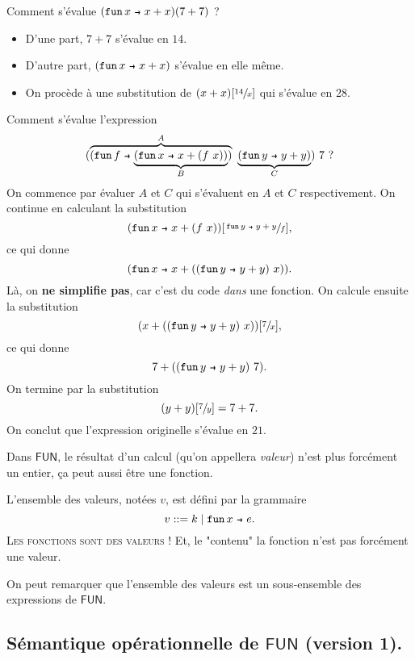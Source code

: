 \documentclass[../main]{subfiles}
\begin{document}
  \begin{exm}
    Comment s'évalue $(\fun x x + x)(7 + 7)$ ?
    \begin{itemize}
      \item D'une part, $7 + 7$ s'évalue en $14$.
      \item D'autre part, $(\fun x x + x)$ s'évalue en elle même.
      \item On procède à une substitution de $(x + x)[\sfrac{14}{x}]$ qui s'évalue en 28.
    \end{itemize}
  \end{exm}

  \begin{exm}
    Comment s'évalue l'expression \[
      (\overbrace{(\fun f \underbrace{(\fun x x + (f\ x))}_B)}^A\ \underbrace{(\fun y y + y)}_C)\ 7\ 
    ?\]
    On commence par évaluer $A$ et $C$ qui s'évaluent en $A$ et $C$ respectivement.
    On continue en calculant la substitution 
    \[
      (\fun x x + (f\ x))[\sfrac{\fun y y + y}{f}]
    ,\] ce qui donne \[
      (\fun x x + ((\fun y y + y)\ x))
    .\]
    Là, on \textbf{ne simplifie pas}, car c'est du code \textit{dans} une fonction.
    On calcule ensuite la substitution \[
      (x + ((\fun y y + y)\ x))[\sfrac{7}{x}]
    ,\]
    ce qui donne \[
      7 + ((\fun y y + y)\ 7)
    .\]
    On termine par la substitution \[
      (y + y)[\sfrac{7}{y}] = 7 + 7
    .\]
    On conclut que l'expression originelle s'évalue en $21$.
      
  \end{exm}

  \begin{rmk}
    Dans $\mathsf{FUN}$, le résultat d'un calcul (qu'on appellera \textit{valeur}) n'est plus forcément un entier, ça peut aussi être une fonction.

    L'ensemble des valeurs, notées $v$, est défini par la grammaire \[
      v ::= k  \mid \fun x e
    .\]
    \textsc{Les fonctions sont des valeurs !} Et, le "contenu" la fonction n'est pas forcément une valeur.

    On peut remarquer que l'ensemble des valeurs est un sous-ensemble des expressions de $\mathsf{FUN}$.
  \end{rmk}

  \subsection{Sémantique opérationnelle de $\mathsf{FUN}$ (version 1).}
\end{document}
